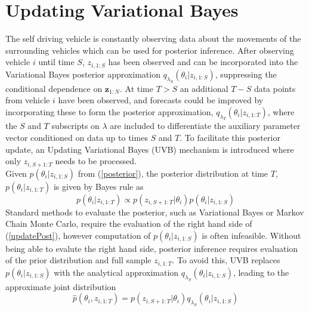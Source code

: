 \documentclass[12pt,a4paper]{article}\usepackage[]{graphicx}\usepackage[]{color}
\begin{document}
\section{Updating Variational Bayes}
\label{sec:UVB}

The self driving vehicle is constantly observing data about the movements of the surrounding vehicles which can be used for posterior inference. After observing vehicle $i$ until time $S$, $z_{i, 1:S}$ has been observed and can be incorporated into the Variational Bayes posterior approximation $q_{\lambda_S}(\theta_{i} | z_{i, 1:S})$, suppressing the conditional dependence on $\textbf{z}_{1:N}$. At time $T > S$ an additional $T - S$ data points from vehicle $i$ have been observed, and forecasts could be improved by incorporating these to form the posterior approximation, $q_{\lambda_T}(\theta_{i} | z_{i, 1:T})$, where the $S$ and $T$ subscripts on $\lambda$ are included to differentiate the auxiliary parameter vector conditioned on data up to times $S$ and $T$. To facilitate this posterior update, an Updating Variational Bayes (UVB) mechanism is introduced where only $z_{i, S+1:T}$ needs to be processed.
\\

Given $p(\theta_{i} | z_{i, 1:S})$ from (\ref{posterior}), the posterior distribution at time $T$, $p(\theta_{i} | z_{i, 1:T})$ is given by Bayes rule as
\begin{equation}
\label{updatePost}
p(\theta_{i} | z_{i, 1:T}) \propto p(z_{i, S+1:T} | \theta_{i})p(\theta_{i} | z_{i, 1:S})
\end{equation}
Standard methods to evaluate the posterior, such as Variational Bayes or Markov Chain Monte Carlo, require the evaluation of the right hand side of (\ref{updatePost}), however computation of $p(\theta_{i} | z_{i, 1:S})$ is often infeasible. Without being able to evalute the right hand side, posterior inference requires evaluation of the prior distribution and full sample $z_{i, 1:T}$. To avoid this, UVB replaces $p(\theta_{i} | z_{i, 1:S})$ with the analytical approximation $q_{\lambda_S}(\theta_{i} | z_{i, 1:S})$, leading to the approximate joint distribution
\begin{equation}
\label{ApproxJoint}
\hat{p}(\theta_{i},  z_{i, 1:T}) = p(z_{i, S+1:T} | \theta_{i})q_{\lambda_S}(\theta_{i} | z_{i, 1:S})
\end{equation}
\\
\end{document}
